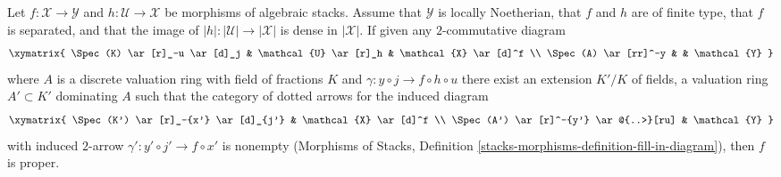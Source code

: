 \begin{lemma}
\label{lemma-refined-valuative-criterion-proper}
Let $f : \mathcal{X} \to \mathcal{Y}$ and $h : \mathcal{U} \to \mathcal{X}$
be morphisms of algebraic stacks. Assume that $\mathcal{Y}$ is
locally Noetherian, that $f$ and $h$ are of finite type,
that $f$ is separated, and that the image of
$|h| : |\mathcal{U}| \to |\mathcal{X}|$ is dense in $|\mathcal{X}|$.
If given any $2$-commutative diagram
$$
\xymatrix{
\Spec(K) \ar[r]_-u \ar[d]_j & \mathcal{U} \ar[r]_h & \mathcal{X} \ar[d]^f \\
\Spec(A) \ar[rr]^-y & & \mathcal{Y}
}
$$
where $A$ is a discrete valuation ring with field of fractions $K$
and $\gamma : y \circ j \to f \circ h \circ u$ there
exist an extension $K'/K$ of fields, a valuation ring $A' \subset K'$
dominating $A$ such that the category of dotted arrows for the
induced diagram
$$
\xymatrix{
\Spec(K') \ar[r]_-{x'} \ar[d]_{j'} & \mathcal{X} \ar[d]^f \\
\Spec(A') \ar[r]^-{y'} \ar@{..>}[ru] & \mathcal{Y}
}
$$
with induced $2$-arrow $\gamma' : y' \circ j' \to f \circ x'$
is nonempty (Morphisms of Stacks, Definition
\ref{stacks-morphisms-definition-fill-in-diagram}), then $f$ is proper.
\end{lemma}

